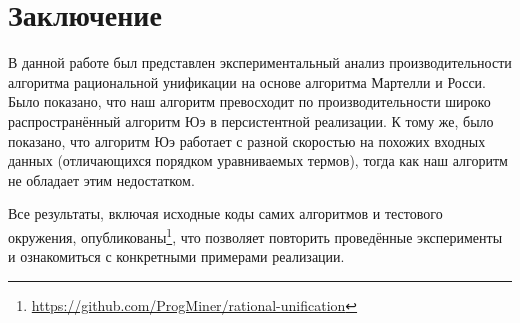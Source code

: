 \section{Заключение}

В данной работе был представлен экспериментальный анализ производительности алгоритма рациональной унификации на основе алгоритма Мартелли и Росси. Было показано, что наш алгоритм превосходит по производительности широко распространённый алгоритм Юэ в персистентной реализации. К тому же, было показано, что алгоритм Юэ работает с разной скоростью на похожих входных данных (отличающихся порядком уравниваемых термов), тогда как наш алгоритм не обладает этим недостатком.

Все результаты, включая исходные коды самих алгоритмов и тестового окружения, опубликованы\footnote{\url{https://github.com/ProgMiner/rational-unification}}, что позволяет повторить проведённые эксперименты и ознакомиться с конкретными примерами реализации.
